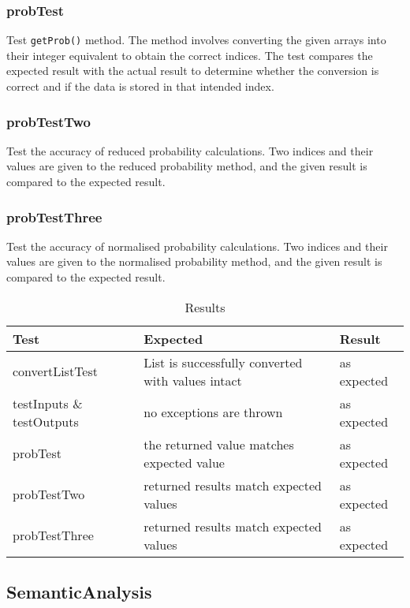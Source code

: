 \documentclass[report.tex]{subfiles}
\begin{document}
\subsubsection{probTest} %
\label{ssub:probTest}
Test \texttt{getProb()} method. The method involves converting the given arrays
into their integer equivalent to obtain the correct indices. The test compares
the expected result with the actual result to determine whether the conversion
is correct and if the data is stored in that intended index.

\subsubsection{probTestTwo} %
\label{ssub:probTestTwo}
Test the accuracy of reduced probability calculations. Two indices and their
values are given to the reduced probability method, and the given result is
compared to the expected result.
\newpage
\subsubsection{probTestThree} %
\label{ssub:probTestThree}
Test the accuracy of normalised probability calculations. Two indices and their
values are given to the normalised probability method, and the given result is
compared to the expected result.

\begin{table}[H]
    \centering
    \begin{tabular}{l | p{6cm} | l}
    Test & Expected & Result \\    
    \hline
    convertListTest & List is successfully converted with values intact
    & as expected \\
    testInputs \& testOutputs & no exceptions are thrown & as expected \\
    probTest & the returned value matches expected value & as expected \\
    probTestTwo & returned results match expected values & as expected \\
    probTestThree & returned results match expected values
    & as expected \\
    \end{tabular}
    \caption{Results}
  \label{tab:box_summary}
\end{table}
\newpage
\subsection{SemanticAnalysis} %
\label{sub:semanticanalysis}
\end{document}
